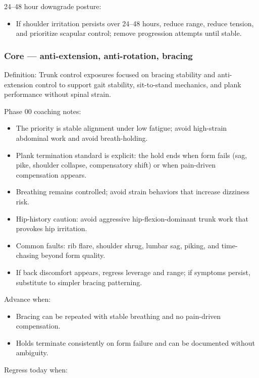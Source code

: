 \documentclass[10pt]{article}
\begin{document}
24–48 hour downgrade posture:

\begin{itemize}
\item If shoulder irritation persists over 24–48 hours, reduce range, reduce tension, and prioritize scapular control; remove progression attempts until stable.
\end{itemize}

\subsubsection*{Core — anti-extension, anti-rotation, bracing}

Definition: Trunk control exposures focused on bracing stability and anti-extension control to support gait stability, sit-to-stand mechanics, and plank performance without spinal strain.

Phase 00 coaching notes:

\begin{itemize}
\item The priority is stable alignment under low fatigue; avoid high-strain abdominal work and avoid breath-holding.
\item Plank termination standard is explicit: the hold ends when form fails (sag, pike, shoulder collapse, compensatory shift) or when pain-driven compensation appears.
\item Breathing remains controlled; avoid strain behaviors that increase dizziness risk.
\item Hip-history caution: avoid aggressive hip-flexion-dominant trunk work that provokes hip irritation.
\item Common faults: rib flare, shoulder shrug, lumbar sag, piking, and time-chasing beyond form quality.
\item If back discomfort appears, regress leverage and range; if symptoms persist, substitute to simpler bracing patterning.
\end{itemize}

Advance when:

\begin{itemize}
\item Bracing can be repeated with stable breathing and no pain-driven compensation.
\item Holds terminate consistently on form failure and can be documented without ambiguity.
\end{itemize}

Regress today when:
\end{document}
